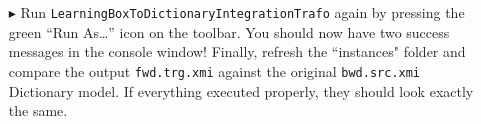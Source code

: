 \begin{itemize}
\newpage

\item[$\blacktriangleright$] Run \texttt{LearningBoxToDictionaryIntegrationTrafo} again by pressing the green ``Run As\ldots'' icon on the toolbar. You should
now have two success messages in the console window! Finally, refresh the ``instances" folder and compare the output \texttt{fwd.trg.xmi} against the original
\texttt{bwd.src.xmi} Dictionary model. If everything executed properly, they should look exactly the same.

\end{itemize}
